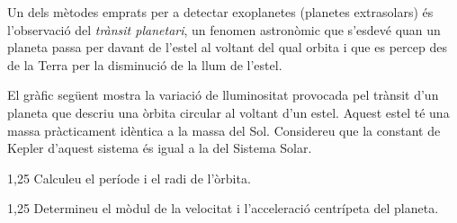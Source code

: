 Un dels mètodes emprats per a detectar exoplanetes (planetes extrasolars) és l'observació del \textit{trànsit planetari}, un fenomen astronòmic que s'esdevé quan un planeta passa per davant de l'estel al voltant del qual orbita i que es percep des de la Terra per la disminució de la llum de l'estel.

El gràfic següent mostra la variació de lluminositat provocada pel trànsit d'un planeta que descriu una òrbita circular al voltant d'un estel. Aquest estel té una massa pràcticament idèntica a la massa del Sol. Considereu que la constant de Kepler d'aquest sistema és igual a la del Sistema Solar.


\begin{apartat}{1,25}
Calculeu el període i el radi de l'òrbita.
\end{apartat}

\begin{apartat}{1,25}
Determineu el mòdul de la velocitat i l'acceleració centrípeta del planeta.
\end{apartat}

